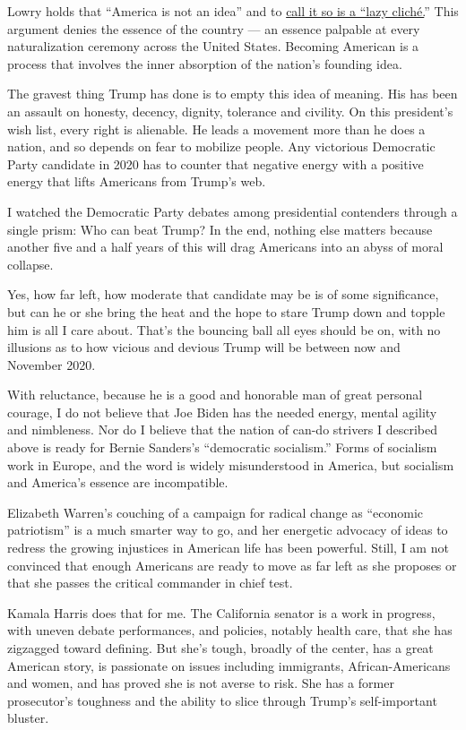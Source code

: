 Lowry holds that ``America is not an idea'' and to
\href{https://twitter.com/richlowry/status/952210040462741505?lang=en}{call
it so is a ``lazy cliché.}'' This argument denies the essence of the
country --- an essence palpable at every naturalization ceremony across
the United States. Becoming American is a process that involves the
inner absorption of the nation's founding idea.

The gravest thing Trump has done is to empty this idea of meaning. His
has been an assault on honesty, decency, dignity, tolerance and
civility. On this president's wish list, every right is alienable. He
leads a movement more than he does a nation, and so depends on fear to
mobilize people. Any victorious Democratic Party candidate in 2020 has
to counter that negative energy with a positive energy that lifts
Americans from Trump's web.

I watched the Democratic Party debates among presidential contenders
through a single prism: Who can beat Trump? In the end, nothing else
matters because another five and a half years of this will drag
Americans into an abyss of moral collapse.

Yes, how far left, how moderate that candidate may be is of some
significance, but can he or she bring the heat and the hope to stare
Trump down and topple him is all I care about. That's the bouncing ball
all eyes should be on, with no illusions as to how vicious and devious
Trump will be between now and November 2020.

With reluctance, because he is a good and honorable man of great
personal courage, I do not believe that Joe Biden has the needed energy,
mental agility and nimbleness. Nor do I believe that the nation of
can-do strivers I described above is ready for Bernie Sanders's
``democratic socialism.'' Forms of socialism work in Europe, and the
word is widely misunderstood in America, but socialism and America's
essence are incompatible.

Elizabeth Warren's couching of a campaign for radical change as
``economic patriotism'' is a much smarter way to go, and her energetic
advocacy of ideas to redress the growing injustices in American life has
been powerful. Still, I am not convinced that enough Americans are ready
to move as far left as she proposes or that she passes the critical
commander in chief test.

Kamala Harris does that for me. The California senator is a work in
progress, with uneven debate performances, and policies, notably health
care, that she has zigzagged toward defining. But she's tough, broadly
of the center, has a great American story, is passionate on issues
including immigrants, African-Americans and women, and has proved she is
not averse to risk. She has a former prosecutor's toughness and the
ability to slice through Trump's self-important bluster.

